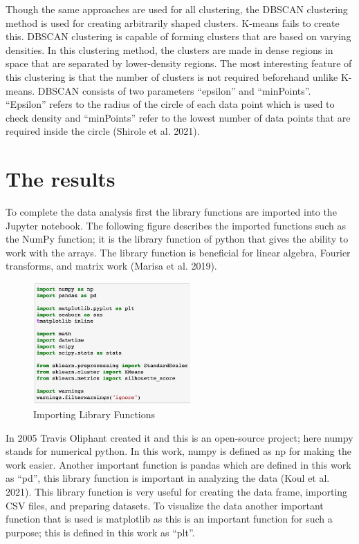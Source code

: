 \documentclass[conference]{IEEEtran}
\begin{document}
Though the same approaches are used for all clustering, the DBSCAN clustering method is used for creating arbitrarily shaped clusters. K-means fails to create this. DBSCAN clustering is capable of forming clusters that are based on varying densities. In this clustering method, the clusters are made in dense regions in space that are separated by lower-density regions. The most interesting feature of this clustering is that the number of clusters is not required beforehand unlike K-means. DBSCAN consists of two parameters “epsilon” and “minPoints”. “Epsilon” refers to the radius of the circle of each data point which is used to check density and “minPoints” refer to the lowest number of data points that are required inside the circle (Shirole et al. 2021).

\section{The results}
 
 To complete the data analysis first the library functions are imported into the Jupyter notebook. The following figure describes the imported functions such as the NumPy function; it is the library function of python that gives the ability to work with the arrays. The library function is beneficial for linear algebra, Fourier transforms, and matrix work (Marisa et al. 2019).

 \begin{figure}[h]
\centering
 \includegraphics[width=6cm]{libs}
 \caption{Importing Library Functions}
 \end{figure}
 
 In 2005 Travis Oliphant created it and this is an open-source project; here numpy stands for numerical python. In this work, numpy is defined as np for making the work easier. Another important function is pandas which are defined in this work as ``pd'', this library function is important in analyzing the data (Koul et al. 2021). This library function is very useful for creating the data frame, importing CSV files, and preparing datasets. To visualize the data another important function that is used is matplotlib as this is an important function for such a purpose; this is defined in this work as “plt”.
\end{document}
